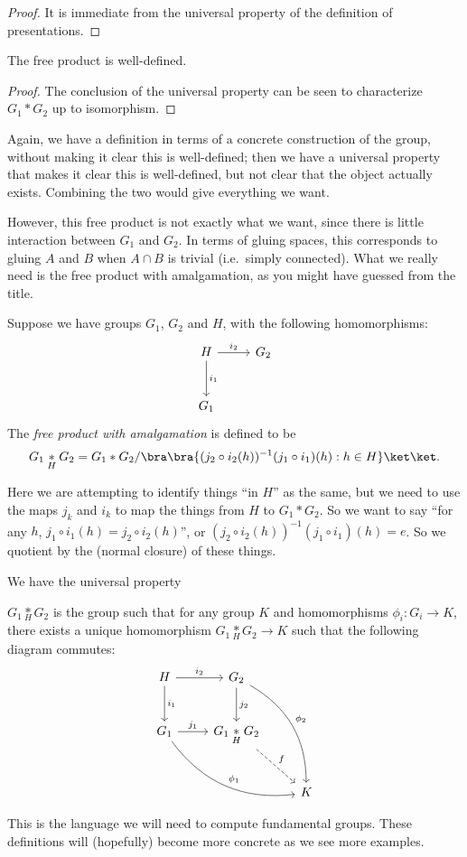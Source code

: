 \documentclass[a4paper]{article}
\begin{document}
\begin{proof}
  It is immediate from the universal property of the definition of presentations.
\end{proof}

\begin{cor}
  The free product is well-defined.
\end{cor}

\begin{proof}
  The conclusion of the universal property can be seen to characterize $G_1 * G_2$ up to isomorphism.
\end{proof}

Again, we have a definition in terms of a concrete construction of the group, without making it clear this is well-defined; then we have a universal property that makes it clear this is well-defined, but not clear that the object actually exists. Combining the two would give everything we want.

However, this free product is not exactly what we want, since there is little interaction between $G_1$ and $G_2$. In terms of gluing spaces, this corresponds to gluing $A$ and $B$ when $A \cap B$ is trivial (i.e.\ simply connected). What we really need is the free product with amalgamation, as you might have guessed from the title.

\begin{defi}
  Suppose we have groups $G_1$, $G_2$ and $H$, with the following homomorphisms:
  \[
    \begin{tikzcd}[row sep=large]
      H \ar[r, "i_2"] \ar[d, "i_1"] & G_2\\
      G_1
    \end{tikzcd}
  \]
  The \emph{free product with amalgamation} is defined to be
  \[
    G_1 \underset{H}{*} G_2 = G_1 * G_2/ \bra \bra \{(j_2 \circ i_2(h))^{-1} (j_1 \circ i_1)(h): h\in H\}\ket \ket.
  \]
\end{defi}
Here we are attempting to identify things ``in $H$'' as the same, but we need to use the maps $j_k$ and $i_k$ to map the things from $H$ to $G_1 * G_2$. So we want to say ``for any $h$, $j_1 \circ i_1 (h) = j_2 \circ i_2(h)$'', or $(j_2 \circ i_2(h))^{-1} (j_1 \circ i_1)(h) = e$. So we quotient by the (normal closure) of these things.

We have the universal property
\begin{lemma}
  $G_1 \underset{H}{*} G_2$ is the group such that for any group $K$ and homomorphisms $\phi_i: G_i \to K$, there exists a unique homomorphism $G_1 \underset{H}{*} G_2 \to K$ such that the following diagram commutes:
  \[
    \begin{tikzcd}[row sep=large]
      H \ar[r, "i_2"] \ar[d, "i_1"] & G_2 \ar[rdd, bend left, "\phi_2"] \ar[d, "j_2"]\\
      G_1 \ar[rrd, bend right, "\phi_1"] \ar [r, "j_1"] & G_1 \underset{H}{*} G_2 \ar [rd, dashed, "f"]\\
      && K
    \end{tikzcd}
  \]
\end{lemma}
This is the language we will need to compute fundamental groups. These definitions will (hopefully) become more concrete as we see more examples.
\end{document}
